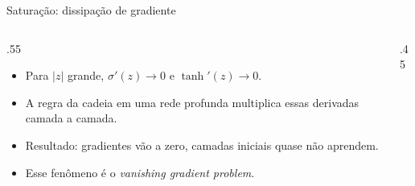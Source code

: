 \documentclass[aspectratio=169,xcolor=dvipsnames]{beamer}
\begin{document}
  \begin{frame}{Saturação: dissipação de gradiente}
    \begin{columns}
      \begin{column}{.55\linewidth}
        \begin{itemize}
          \item Para $|z|$ grande, $\sigma'(z)\to 0$ e $\tanh'(z)\to 0$.
          \item A regra da cadeia em uma rede profunda multiplica essas derivadas
            camada a camada.
          \item Resultado: gradientes vão a zero, camadas iniciais quase não aprendem.
          \item Esse fenômeno é o \textit{vanishing gradient problem}.
        \end{itemize}
      \end{column}
      \begin{column}{.45\linewidth}
        \centering
      \end{column}
    \end{columns}
  \end{frame}
\end{document}
